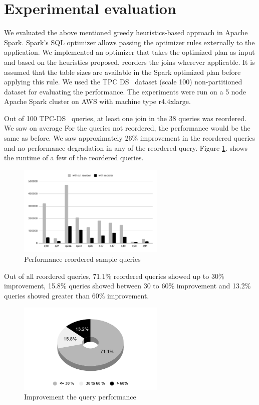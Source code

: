 \section{Experimental evaluation}\label{sec:exp-evaluation}
We evaluated the above mentioned greedy heuristics-based approach in Apache Spark. Spark's SQL optimizer allows passing the optimizer rules externally to the application. We implemented an optimizer that takes the optimized plan as input and based on the heuristics proposed, reorders the joins wherever applicable. It is assumed that the table sizes are available in the Spark optimized plan before applying this rule. We used the TPC DS~\cite{b14}  dataset (scale 100) non-partitioned dataset for evaluating the performance. The experiments were run on a 5 node Apache Spark cluster on AWS with machine type r4.4xlarge.

Out of 100 TPC-DS~\cite{b14}  queries, at least one join in the 38 queries was reordered. We saw on average  For the queries not reordered, the performance would be the same as before. We saw approximately 26\% improvement in the reordered queries and no performance degradation in any of the reordered query. Figure \ref{performance_number}. shows the runtime of a few of the reordered queries.

\begin{figure}[ht]
    \centerline{\includegraphics[width=7cm]{fig/chart.png}}
    \caption{Performance reordered sample queries}
    \label{performance_number}
\end{figure}

Out of all reordered queries, 71.1\% reordered queries showed up to 30\% improvement, 15.8\% queries showed between 30 to 60\% improvement and 13.2\% queries showed greater than 60\% improvement.

\begin{figure}[ht]
\centerline{\includegraphics[width=7cm]{fig/pie.png}}
\caption{Improvement the query performance}
\label{performance_pie_chart}
\end{figure}

